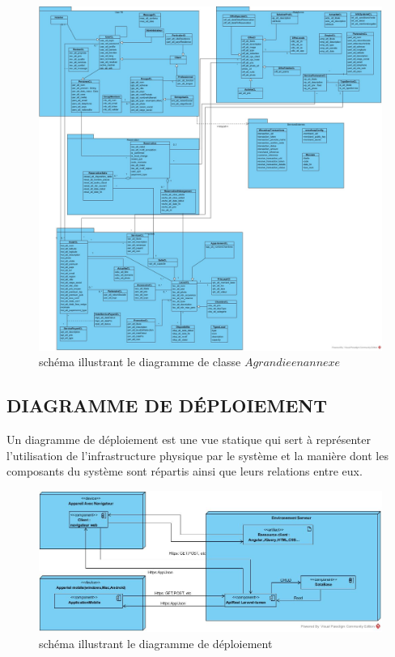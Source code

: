 \begin{figure}[h]
	\begin{center}
		\includegraphics[scale=0.3]{images/diag_classe.jpg}
		\caption{schéma illustrant le diagramme de classe \(Agrandie en annexe\)}
		\label{synthese-cout-salariej}
	\end{center}
\end{figure}


\subsection{DIAGRAMME DE DÉPLOIEMENT}

Un diagramme de déploiement est une vue statique qui sert à représenter l'utilisation de l'infrastructure physique par le système et la manière dont les composants du système sont répartis ainsi que leurs relations entre eux.

\begin{figure}[h]
	\begin{center}
		\includegraphics[scale=0.5]{images/Deployment_Diagram.jpg}
		\caption{schéma illustrant le diagramme de déploiement}
		\label{synthese-cout}
	\end{center}
\end{figure}

